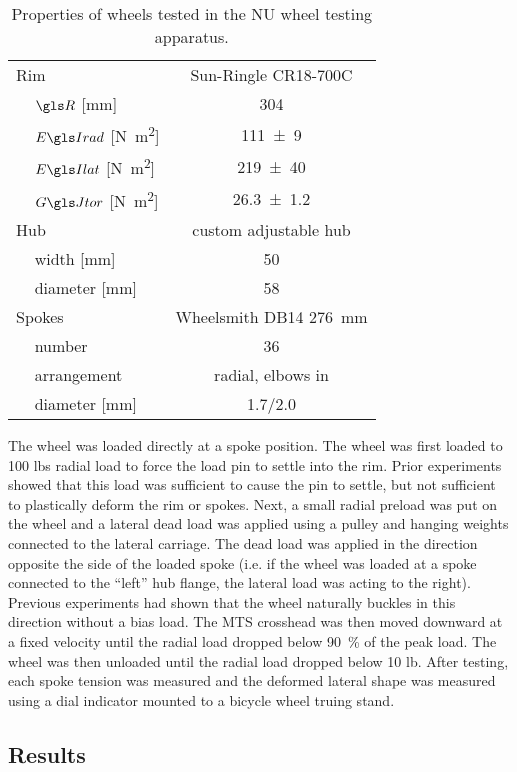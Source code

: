 \documentclass[\rootdir/thesis.tex]{subfiles}
\begin{document}
\begin{table}
\caption{Properties of wheels tested in the NU wheel testing apparatus.}
\label{tab:rad_buckling_wheels}
\begin{tabular}{llc}
\hline
\multicolumn{2}{l}{Rim}& Sun-Ringle CR18-700C\\
\,& $\R$ [\si{mm}]         & \num{304}\\
\,& $\EIr$ [\si{N.m^2}]    & \num{111+-9}\\
\,& $\EIl$ [\si{N.m^2}]    & \num{219+-40}\\
\,& $\GJ$   [\si{N.m^2}]   & \num{26.3+-1.2}\\
\multicolumn{2}{l}{Hub}    & custom adjustable hub\\
\,& width [\si{mm}]        & 50\\
\,& diameter [\si{mm}]     & 58\\
\multicolumn{2}{l}{Spokes} & Wheelsmith DB14 \SI{276}{mm}\\
\,& number                 & 36\\
\,& arrangement            & radial, elbows in\\
\,& diameter [\si{mm}]     & 1.7/2.0\\
\hline
\end{tabular}
\end{table}

The wheel was loaded directly at a spoke position. The wheel was first loaded to 100 lbs radial load to force the load pin to settle into the rim. Prior experiments showed that this load was sufficient to cause the pin to settle, but not sufficient to plastically deform the rim or spokes. Next, a small radial preload was put on the wheel and a lateral dead load was applied using a pulley and hanging weights connected to the lateral carriage. The dead load was applied in the direction opposite the side of the loaded spoke (i.e. if the wheel was loaded at a spoke connected to the ``left'' hub flange, the lateral load was acting to the right). Previous experiments had shown that the wheel naturally buckles in this direction without a bias load. The MTS crosshead was then moved downward at a fixed velocity until the radial load dropped below \SI{90}{\percent} of the peak load. The wheel was then unloaded until the radial load dropped below 10 lb. After testing, each spoke tension was measured and the deformed lateral shape was measured using a dial indicator mounted to a bicycle wheel truing stand.

\subsection{Results}
\end{document}
